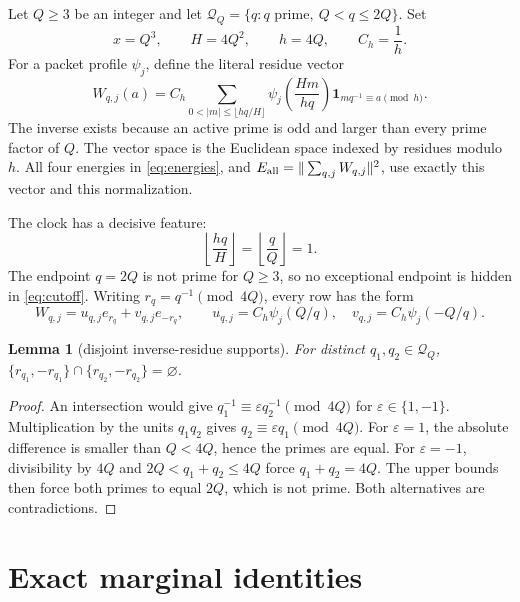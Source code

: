 \documentclass[11pt]{article}
\newtheorem{lemma}{Lemma}
\begin{document}
Let \(Q\geq 3\) be an integer and let
\(\mathcal Q_Q=\{q: q\text{ prime},\ Q<q\leq 2Q\}\).  Set
\begin{equation}
 x=Q^3,\qquad H=4Q^2,\qquad h=4Q,
 \qquad C_h=\frac1h.
 \label{eq:clock}
\end{equation}
For a packet profile \(\psi_j\), define the literal residue vector
\begin{equation}
 W_{q,j}(a)=C_h\sum_{0<|m|\leq\lfloor hq/H\rfloor}
 \psi_j\!\left(\frac{Hm}{hq}\right)
 \mathbf 1_{m q^{-1}\equiv a\pmod h}.
 \label{eq:row}
\end{equation}
The inverse exists because an active prime is odd and larger than every prime
factor of \(Q\).  The vector space is the Euclidean space indexed by residues
modulo \(h\).  All four energies in \eqref{eq:energies}, and
\(E_{\rm all}=\|\sum_{q,j}W_{q,j}\|^2\), use exactly this vector and this
normalization.

The clock has a decisive feature:
\begin{equation}
 \left\lfloor\frac{hq}{H}\right\rfloor
 =\left\lfloor\frac qQ\right\rfloor=1.
 \label{eq:cutoff}
\end{equation}
The endpoint \(q=2Q\) is not prime for \(Q\geq3\), so no exceptional endpoint
is hidden in \eqref{eq:cutoff}.  Writing \(r_q=q^{-1}\pmod{4Q}\), every row
has the form
\begin{equation}
 W_{q,j}=u_{q,j}e_{r_q}+v_{q,j}e_{-r_q},\qquad
 u_{q,j}=C_h\psi_j(Q/q),\quad v_{q,j}=C_h\psi_j(-Q/q).
 \label{eq:twopoint}
\end{equation}

\begin{lemma}[disjoint inverse-residue supports]
For distinct \(q_1,q_2\in\mathcal Q_Q\),
\(\{r_{q_1},-r_{q_1}\}\cap\{r_{q_2},-r_{q_2}\}=\varnothing\).
\end{lemma}
\begin{proof}
An intersection would give
\(q_1^{-1}\equiv\varepsilon q_2^{-1}\pmod{4Q}\) for
\(\varepsilon\in\{1,-1\}\).  Multiplication by the units \(q_1q_2\)
gives \(q_2\equiv\varepsilon q_1\pmod{4Q}\).  For \(\varepsilon=1\),
the absolute difference is smaller than \(Q<4Q\), hence the primes are equal.
For \(\varepsilon=-1\), divisibility by \(4Q\) and
\(2Q<q_1+q_2\leq4Q\) force \(q_1+q_2=4Q\).  The upper bounds then force
both primes to equal \(2Q\), which is not prime.  Both alternatives are
contradictions.
\end{proof}

\section{Exact marginal identities}
\end{document}
